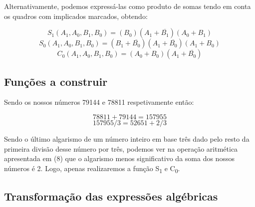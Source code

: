 \documentclass[a4paper,12pt]{article}
\begin{document}
Alternativamente, podemos expressá-las como produto de somas tendo em conta os quadros com implicados marcados, obtendo:


\begin{equation}
S_1(A_1,A_0,B_1,B_0) = (B_0)(A_1+\overline{B_1})(A_0+B_1)
\end{equation}
\begin{equation}
S_0(A_1,A_0,B_1,B_0) = (B_1+\overline{B_0})(A_1+\overline{B_0})(A_1+B_0)
\end{equation}
\begin{equation}
C_0(A_1,A_0,B_1,B_0) = (A_0+B_0)(A_1+\overline{B_0})
\end{equation}

\pagebreak

\subsection{Funções a construir}

Sendo os nossos números 79144 e 78811 respetivamente então:

\begin{equation}
78811 + 79144 = 157955
\end{equation}
\begin{equation}
157955/3 = 52651 + 2/3
\end{equation}

Sendo o último algarismo de um número inteiro em base três dado pelo resto
da primeira divisão desse número por três, podemos ver na operação aritmética
apresentada em (8) que o algarismo menos significativo da soma dos nossos números
é 2. Logo, apenas realizaremos a função S\textsubscript{1} e C\textsubscript{0}. 

\subsection{Transformação das expressões algébricas}
\end{document}
